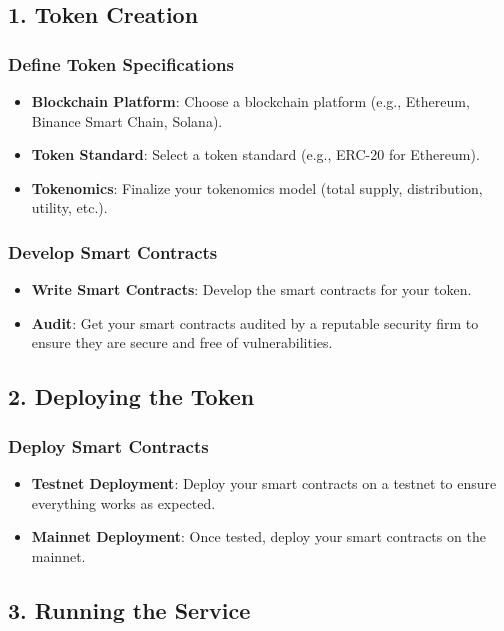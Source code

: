 \documentclass{tufte-handout}
\begin{document}
\subsection*{1. Token Creation}

\subsubsection*{Define Token Specifications}
\begin{itemize}
    \item \textbf{Blockchain Platform}: Choose a blockchain platform (e.g., Ethereum, Binance Smart Chain, Solana).
    \item \textbf{Token Standard}: Select a token standard (e.g., ERC-20 for Ethereum).
    \item \textbf{Tokenomics}: Finalize your tokenomics model (total supply, distribution, utility, etc.).
\end{itemize}

\subsubsection*{Develop Smart Contracts}
\begin{itemize}
    \item \textbf{Write Smart Contracts}: Develop the smart contracts for your token.
    \item \textbf{Audit}: Get your smart contracts audited by a reputable security firm to ensure they are secure and free of vulnerabilities.
\end{itemize}

\subsection*{2. Deploying the Token}

\subsubsection*{Deploy Smart Contracts}
\begin{itemize}
    \item \textbf{Testnet Deployment}: Deploy your smart contracts on a testnet to ensure everything works as expected.
    \item \textbf{Mainnet Deployment}: Once tested, deploy your smart contracts on the mainnet.
\end{itemize}

\subsection*{3. Running the Service}
\end{document}
